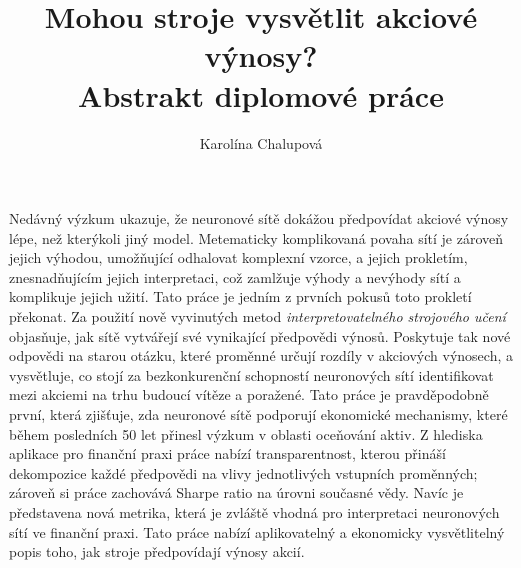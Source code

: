 \documentclass[12pt]{article}
\begin{document}
\title{%
	Mohou stroje vysv\v{e}tlit akciové výnosy? \\
	\large Abstrakt diplomové práce}
\author{Karolína Chalupová}
\maketitle

Nedávný výzkum ukazuje, \v{z}e neuronové sít\v{e} doká\v{z}ou p\v{r}edpovídat akciové výnosy lépe, ne\v{z} kterýkoli jiný model. Metematicky komplikovaná povaha sítí je zárove\v{n} jejich výhodou, umo\v{z}\v{n}ující odhalovat komplexní vzorce, a jejich prokletím, znesnad\v{n}ujícím jejich interpretaci, co\v{z} zaml\v{z}uje výhody a nevýhody sítí a komplikuje jejich u\v{z}ití. Tato práce je jedním z prvních pokus\r{u} toto prokletí p\v{r}ekonat. Za pou\v{z}ití nov\v{e} vyvinutých metod \textit{interpretovatelného strojového u\v{c}ení} objas\v{n}uje, jak sít\v{e} vytvá\v{r}ejí své vynikající p\v{r}edpov\v{e}di výnos\r{u}. Poskytuje tak nové odpov\v{e}di na starou otázku, které prom\v{e}nn\'{e} ur\v{c}ují rozd\'{i}ly v akciov\'{y}ch v\'{y}nosech, a vysv\v{e}tluje, co stoj\'{i} za bezkonkuren\v{c}n\'{i} schopnost\'{i} neuronov\'{y}ch s\'{i}t\'{i} identifikovat mezi akciemi na trhu budouc\'{i} v\'{i}t\v{e}ze a pora\v{z}en\'{e}. Tato práce je pravd\v{e}podobn\v{e} první, která zji\v{s}\v{t}uje, zda neuronové sít\v{e} podporují ekonomické mechanismy, které b\v{e}hem posledních 50 let p\v{r}inesl výzkum v oblasti oce\v{n}ování aktiv. Z hlediska aplikace pro finan\v{c}ní praxi práce nabízí transparentnost, kterou p\v{r}iná\v{s}í dekompozice ka\v{z}d\'{e} p\v{r}edpov\v{e}di na vlivy jednotliv\'{y}ch vstupn\'{i}ch prom\v{e}nn\'{y}ch; zárove\v{n} si práce zachovává Sharpe ratio na úrovni sou\v{c}asné v\v{e}dy. Nav\'{i}c je p\v{r}edstavena nov\'{a} metrika, kter\'{a} je zvl\'{a}\v{s}t\v{e} vhodn\'{a} pro interpretaci neuronov\'{y}ch s\'{i}t\'{i} ve finan\v{c}n\'{i} praxi. Tato pr\'{a}ce nab\'{i}z\'{i} aplikovateln\'{y} a ekonomicky vysv\v{e}tliteln\'{y} popis toho, jak stroje p\v{r}edpov\'{i}daj\'{i} v\'{y}nosy akci\'{i}.
 
\end{document}
